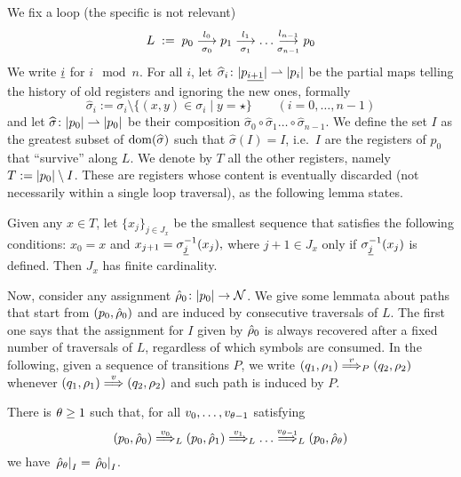 We fix a loop (the specific \hdma{} is not relevant)
\[
	L \;:=\; p_0 \overset{l_0}{\underset{\sigma_0}{\longrightarrow}} p_1 \overset{l_1}{\underset{\sigma_1}{\longrightarrow}} \dots \overset{l_{n-1}}{\underset{\sigma_{n-1}}{\longrightarrow}} p_0
\]
We write ${\underline{i}}$ for $i \mod n$. 
For all $i$, let $\widehat{\sigma}_i \colon |p_{\underline{i+1}}| \rightharpoonup |p_i|$ be the partial maps telling the history of old registers and ignoring the new ones, formally
\[
	\widehat{\sigma}_i := \sigma_i \setminus \{ (x,y) \in \sigma_i \mid y = \star \} 
	\qquad (i=0,\dots,n-1)
\]
and let $\widehat{\sigma} \colon |p_0| \rightharpoonup |p_0|$ be their composition $\widehat{\sigma}_0 \circ \widehat{\sigma}_1 \dots \circ \widehat{\sigma}_{n-1}$. We define the set $I$ as the greatest subset of $\operatorname{dom}(\widehat{\sigma})$ such that $ \widehat{\sigma}(I) = I$,
i.e.\ $I$ are the registers of $p_0$ that ``survive'' along $L$. We denote by $T$ all the other registers, namely $T := |p_0| \setminus I$. These are registers whose content is eventually discarded (not necessarily within a single loop traversal), as the following lemma states.
%
%
\begin{lemma}
\label{lem:rho-forget}
Given any $x \in T$, let $\{x_j\}_{j \in J_x}$ be the smallest sequence that satisfies the following conditions:
$
	x_0 = x
$
and
$
	x_{j+1} = \sigma_{{\underline{j}}}^{-1}(x_j),
$
where $j+1 \in J_x$ only if $\sigma_{{\underline{j}}}^{-1}(x_j)$ is defined. Then $J_x$ has finite cardinality.
\end{lemma}
%
Now, consider any assignment $\hat{\rho}_0 \colon |p_0| \to \mathcal{N}$. We give some lemmata about paths that start from $(p_0,\hat{\rho}_0)$ and are induced by consecutive traversals of $L$. The first one says that the assignment for $I$ given by $\hat{\rho}_0$ is always recovered after a fixed number of traversals of $L$, regardless of which symbols are consumed. In the following, given a sequence of transitions $P$, we write $(q_1,\rho_1) \overset{v}{\Longrightarrow}_{P} (q_2,\rho_2)$ whenever $(q_1,\rho_1) \overset{v}{\Longrightarrow} (q_2,\rho_2)$ and such path is induced by $P$.
%
\begin{lemma} 
\label{lem:idI}
There is $\theta \geq 1$ such that, for all $v_0,\dots,v_{\theta-1}$ satisfying
\[
	(p_0,\hat{\rho}_0) \overset{v_0}{\Longrightarrow}_{L} (p_0,\hat{\rho}_1) \overset{v_1}{\Longrightarrow}_{L} \dots \overset{v_{\theta-1}}{\Longrightarrow}_{L} (p_0,\hat{\rho}_\theta)
\]
we have $\left. \hat{\rho}_\theta \right|_{I} = \left. \hat{\rho}_0 \right|_{I}$.
\end{lemma}
